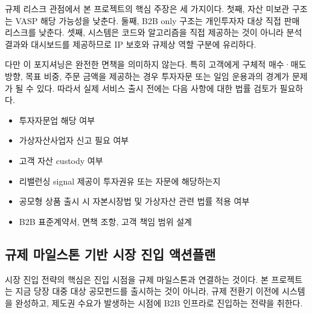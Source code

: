 \documentclass[12pt,a4paper]{article}
\begin{document}
규제 리스크 관점에서 본 프로젝트의 핵심 주장은 세 가지이다. 첫째, 자산 미보관 구조는 VASP 해당 가능성을 낮춘다. 둘째, B2B only 구조는 개인투자자 대상 직접 판매 리스크를 낮춘다. 셋째, 시스템은 코드와 알고리즘을 직접 제공하는 것이 아니라 분석 결과와 대시보드를 제공하므로 IP 보호와 규제상 역할 구분에 유리하다.

다만 이 포지셔닝은 완전한 면책을 의미하지 않는다. 특히 고객에게 구체적 매수·매도 방향, 목표 비중, 주문 금액을 제공하는 경우 투자자문 또는 일임 운용과의 경계가 문제가 될 수 있다. 따라서 실제 서비스 출시 전에는 다음 사항에 대한 법률 검토가 필요하다.

\begin{itemize}
\item 투자자문업 해당 여부
\item 가상자산사업자 신고 필요 여부
\item 고객 자산 custody 여부
\item 리밸런싱 signal 제공이 투자권유 또는 자문에 해당하는지
\item 공모형 상품 출시 시 자본시장법 및 가상자산 관련 법률 적용 여부
\item B2B 표준계약서, 면책 조항, 고객 책임 범위 설계
\end{itemize}



\subsection{규제 마일스톤 기반 시장 진입 액션플랜}

시장 진입 전략의 핵심은 진입 시점을 규제 마일스톤과 연결하는 것이다. 본 프로젝트는 지금 당장 대중 대상 공모펀드를 출시하는 것이 아니라, 규제 전환기 이전에 시스템을 완성하고, 제도권 수요가 발생하는 시점에 B2B 인프라로 진입하는 전략을 취한다.
\end{document}

